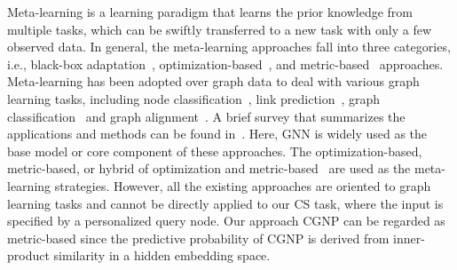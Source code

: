 Meta-learning is a learning paradigm that learns the prior knowledge from multiple tasks, which can be swiftly transferred to a new task with only a few observed data. 
In general, the meta-learning approaches fall into three categories, i.e.,  black-box adaptation~\cite{NTM, meta1, MANN, meta4}, optimization-based~\cite{MAML, meta2, reptile}, and metric-based~\cite{prototypical, RN, MN} approaches. 
%
Meta-learning has been adopted over graph data to deal with various graph learning tasks, including node classification~\cite{metagnn, GMETA}, link prediction~\cite{metagraph, GMETA}, graph classification~\cite{5, DBLP:conf/cikm/MaBYZYYZY20} and graph alignment~\cite{62, 53}. 
A brief survey that summarizes the applications and methods can be found in~\cite{DBLP:journals/corr/abs-2103-00137}. 
Here, GNN is widely used as the base model or core component of these approaches. The optimization-based, metric-based, or hybrid of optimization and metric-based~\cite{GMETA} are used as the meta-learning strategies.
However, all the existing approaches are oriented to graph learning tasks and cannot be directly applied to our CS task, where the input is specified by a personalized query node.
%
Our approach CGNP can be regarded as metric-based since the predictive probability of CGNP is derived from inner-product similarity in a hidden embedding space. %
